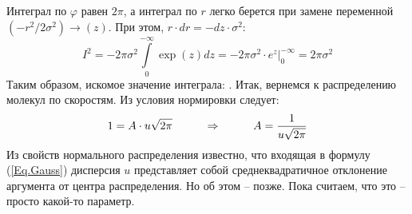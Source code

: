 \documentclass[12pt,epsfig,color,russian]{article}
\begin{document}
Интеграл по $\varphi$ равен $2\pi$, а интеграл по $r$ легко берется при замене переменной $(-r^2/2\sigma^2)\rightarrow (z)$. При этом, $r\cdot dr=-dz\cdot\sigma^2$:
\begin{displaymath}
I^2=-2\pi\sigma^2\int\limits_0^{-\infty}\exp\left(z\right) dz = -2\pi\sigma^2\cdot e^z|_0^{-\infty}=2\pi\sigma^2
\end{displaymath}
Таким образом, искомое значение интеграла: .
\newpage
Итак, вернемся к распределению молекул по скоростям. Из условия нормировки следует:\vspace{-5mm}
\begin{equation}
1=A\cdot u\sqrt{2\pi}\hspace{10mm}\Rightarrow\hspace{10mm}A=\frac{1}{u\sqrt{2\pi}}
\end{equation}
Из свойств нормального распределения  известно, что входящая в формулу (\ref{Eq.Gauss}) дисперсия $u$ представляет собой среднеквадратичное отклонение аргу\-мен\-та от центра распределения.  Но об этом -- позже. Пока считаем, что это -- просто какой-то параметр.
\end{document}
